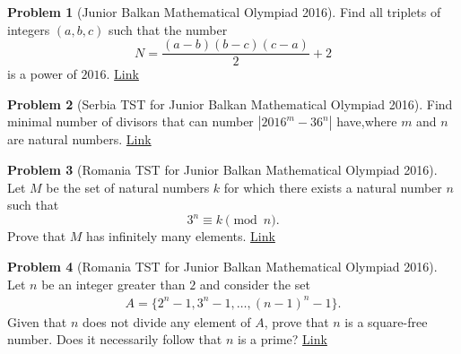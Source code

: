 \documentclass[]{article}
\theoremstyle{definition}
\newtheorem{problem}{Problem}
\begin{document}
\begin{problem}[Junior Balkan Mathematical Olympiad 2016]
	Find all triplets of integers $(a,b,c)$ such that the number
	$$N = \frac{(a-b)(b-c)(c-a)}{2} + 2$$is a power of $2016$. \hfill \href{http://artofproblemsolving.com/community/c6h1263182p6565545}{Link}
\end{problem}



\begin{problem}[Serbia TST for Junior Balkan Mathematical Olympiad 2016]
	Find minimal number of divisors that can number $|2016^m-36^n|$ have,where $m$ and $n$ are natural numbers. \hfill \href{http://artofproblemsolving.com/community/c6h1245773p6388606}{Link}
\end{problem}




\begin{problem}[Romania TST for Junior Balkan Mathematical Olympiad 2016]
	Let $M$ be the set of natural numbers $k$ for which there exists a natural number $n$ such that
	$$3^n \equiv k\pmod n.$$ Prove that $M$ has infinitely many elements. \hfill \href{http://artofproblemsolving.com/community/c6h1256385p6499304}{Link}
\end{problem}



\begin{problem}[Romania TST for Junior Balkan Mathematical Olympiad 2016]
	Let $n$ be an integer greater than $2$ and consider the set
		\begin{align*}
			A = \{2^n-1,3^n-1,\dots,(n-1)^n-1\}.
		\end{align*}
	Given that $n$ does not divide any element of $A$, prove that $n$ is a square-free number. Does it necessarily follow that $n$ is a prime? \hfill \href{http://artofproblemsolving.com/community/c6h1257385p6509508}{Link}
\end{problem}
\end{document}
